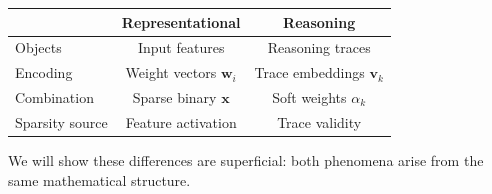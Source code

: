 \begin{center}
\begin{tabular}{lcc}
\toprule
& \textbf{Representational} & \textbf{Reasoning} \\
\midrule
Objects & Input features & Reasoning traces \\
Encoding & Weight vectors $\mathbf{w}_i$ & Trace embeddings $\mathbf{v}_k$ \\
Combination & Sparse binary $\mathbf{x}$ & Soft weights $\alpha_k$ \\
Sparsity source & Feature activation & Trace validity \\
\bottomrule
\end{tabular}
\end{center}

We will show these differences are superficial: both phenomena arise from the same mathematical structure.
